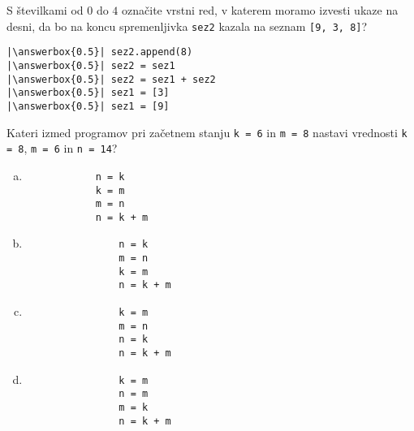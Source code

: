 \documentclass[arhiv, 10pt]{../izpit}
\newcommand{\inlinepy}[1]{\texttt{#1}}
\newcommand{\answerbox}[1]{\framebox{\vphantom{\large M}\hspace{#1cm}}}
\begin{document}
        \naloga*
        \begin{multicols}{2}
        \noindent 
        S številkami od $0$ do $4$ označite vrstni red, v katerem moramo izvesti ukaze na desni, da bo na koncu spremenljivka \inlinepy{sez2} kazala na seznam \inlinepy{[9, 3, 8]}?
    
        \columnbreak
        \noindent
        \begin{verbatim}
|\answerbox{0.5}| sez2.append(8)
|\answerbox{0.5}| sez2 = sez1
|\answerbox{0.5}| sez2 = sez1 + sez2
|\answerbox{0.5}| sez1 = [3]
|\answerbox{0.5}| sez1 = [9]

        \end{verbatim}
        \end{multicols}
    
            
        \naloga*
        
        Kateri izmed programov pri začetnem stanju
            \inlinepy{k = 6} in
            \inlinepy{m = 8}
        nastavi vrednosti
            \inlinepy{k = 8},
            \inlinepy{m = 6} in
            \inlinepy{n = 14}?
    
        \begin{multicols}{4}
        \begin{enumerate}[(a)]
\item 
            \begin{verbatim}
            n = k
            k = m
            m = n
            n = k + m
            \end{verbatim}
        
\item 
                \begin{verbatim}
                n = k
                m = n
                k = m
                n = k + m
                \end{verbatim}
            
\item 
                \begin{verbatim}
                k = m
                m = n
                n = k
                n = k + m
                \end{verbatim}
            
\item 
                \begin{verbatim}
                k = m
                n = m
                m = k
                n = k + m
                \end{verbatim}
            
\end{enumerate}

        \end{multicols}
    
\end{document}
